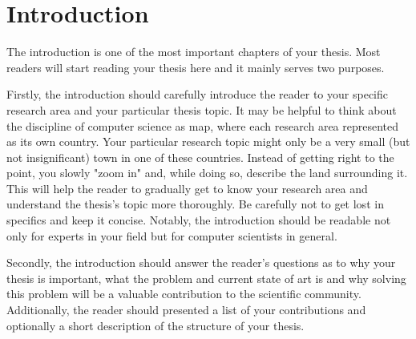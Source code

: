 \chapter{Introduction}\label{ch:introduction}
The introduction is one of the most important chapters of your thesis.
Most readers will start reading your thesis here and it mainly serves two purposes.

Firstly, the introduction should carefully introduce the reader to your specific research area and your particular thesis topic.
It may be helpful to think about the discipline of computer science as map, where each research area represented as its own country.
Your particular research topic might only be a very small (but not insignificant) town in one of these countries.
Instead of getting right to the point, you slowly "zoom in" and, while doing so, describe the land surrounding it.
This will help the reader to gradually get to know your research area and understand the thesis's topic more thoroughly.
Be carefully not to get lost in specifics and keep it concise.
Notably, the introduction should be readable not only for experts in your field but for computer scientists in general.

Secondly, the introduction should answer the reader's questions as to why your thesis is important, what the problem and current state of art is and why solving this problem will be a valuable contribution to the scientific community.
Additionally, the reader should presented a list of your contributions and optionally a short description of the structure of your thesis.

